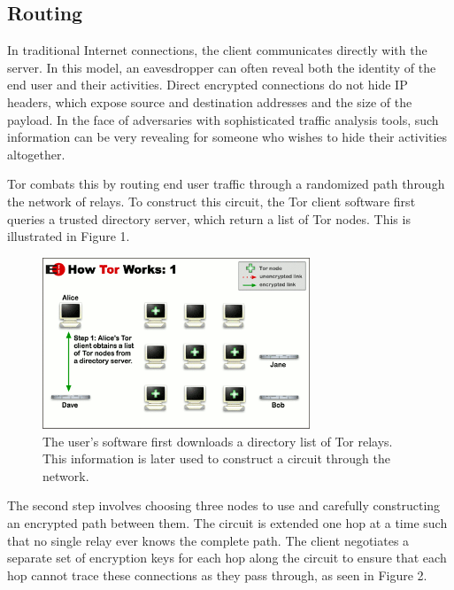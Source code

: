\documentclass[journal]{IEEEtran}
\begin{document}
\subsection{Routing}

In traditional Internet connections, the client communicates directly with the server. In this model, an eavesdropper can often reveal both the identity of the end user and their activities. Direct encrypted connections do not hide IP headers, which expose source and destination addresses and the size of the payload. In the face of adversaries with sophisticated traffic analysis tools, such information can be very revealing for someone who wishes to hide their activities altogether.

Tor combats this by routing end user traffic through a randomized path through the network of relays. To construct this circuit, the Tor client software first queries a trusted directory server, which return a list of Tor nodes.\cite{Xin2009} This is illustrated in Figure 1.

\begin{figure}[htbp]
\centering
\begin{minipage}{8 cm}
    \includegraphics[width=80mm]{resources/circuit-building-1.png}
    \caption{The user's software first downloads a directory list of Tor relays. This information is later used to construct a circuit through the network.\cite{McCoy2008}\cite{TorOverview}}
\end{minipage}
\end{figure}

The second step involves choosing three nodes to use and carefully constructing an encrypted path between them. The circuit is extended one hop at a time such that no single relay ever knows the complete path. The client negotiates a separate set of encryption keys for each hop along the circuit to ensure that each hop cannot trace these connections as they pass through, as seen in Figure 2.
\end{document}
